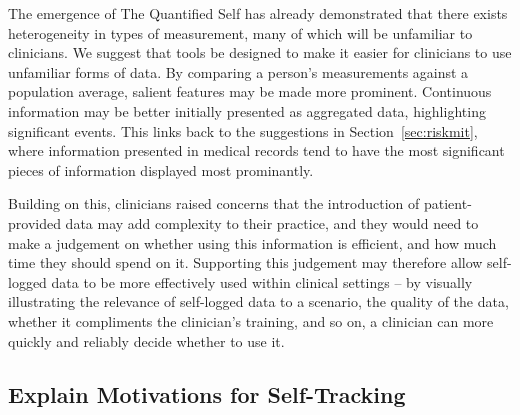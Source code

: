 \documentclass{sigchi}
\begin{document}

The emergence of The Quantified Self has already demonstrated that there exists heterogeneity in types of measurement, many of which will be unfamiliar to clinicians. We suggest that tools be designed to make it easier for clinicians to use unfamiliar forms of data. By comparing a person's measurements against a population average, salient features may be made more prominent. Continuous information may be better initially presented as aggregated data, highlighting significant events. This links back to the suggestions in Section~\ref{sec:riskmit}, where information presented in medical records tend to have the most significant pieces of information displayed most prominantly.  %

Building on this, clinicians raised concerns that the introduction of patient-provided data may add complexity to their practice, and they would need to make a judgement on whether using this information is efficient, and how much time they should spend on it. Supporting this judgement may therefore allow self-logged data to be more effectively used within clinical settings -- by visually illustrating the relevance of self-logged data to a scenario, the quality of the data, whether it compliments the clinician's training, and so on, a clinician can more quickly and reliably decide whether to use it.







\subsection{Explain Motivations for Self-Tracking} 



\end{document}
